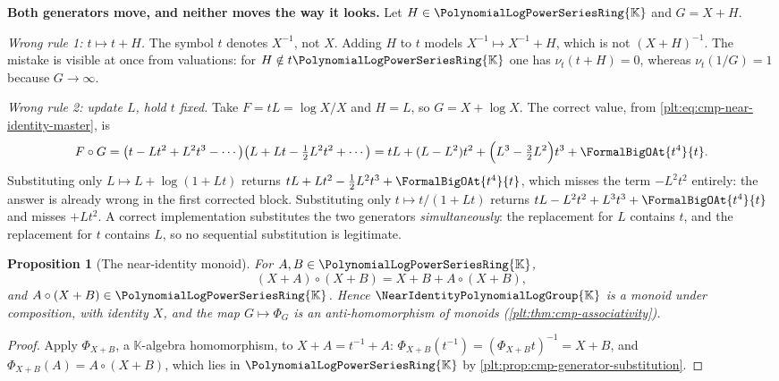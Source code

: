 \documentclass[11pt,oneside]{article}
\theoremstyle{plain}
\newtheorem{proposition}[theorem]{Proposition}
\theoremstyle{definition}
\theoremstyle{remark}
\newcommand{\K}{\mathbb{K}}
\newcommand{\PLpow}{\PolynomialLogPowerSeriesRing{\K}}   %
\newcommand{\Gnear}{\NearIdentityPolynomialLogGroup{\K}} %
\newcommand{\ordt}{\nu_{t}}                              %
\newcommand{\compose}{\mathbin{\circ}}
\begin{document}
\begin{warningbox}
\textbf{Both generators move, and neither moves the way it looks.}
Let \(H\in\PLpow\) and \(G=X+H\).

\emph{Wrong rule 1: \(t\mapsto t+H\).}  The symbol \(t\) denotes \(X^{-1}\),
not \(X\).  Adding \(H\) to \(t\) models \(X^{-1}\mapsto X^{-1}+H\), which is
not \((X+H)^{-1}\).  The mistake is visible at once from valuations: for
\(H\notin t\PLpow\) one has \(\ordt(t+H)=0\), whereas \(\ordt(1/G)=1\) because
\(G\to\infty\).

\emph{Wrong rule 2: update \(L\), hold \(t\) fixed.}  Take
\(F=tL=\log X/X\) and \(H=L\), so \(G=X+\log X\).  The correct value, from
\eqref{plt:eq:cmp-near-identity-master}, is
\[
 F\compose G
 =\bigl(t-Lt^{2}+L^{2}t^{3}-\cdots\bigr)
  \bigl(L+Lt-\tfrac12L^{2}t^{2}+\cdots\bigr)
 =tL+(L-L^{2})t^{2}+\Bigl(L^{3}-\tfrac32L^{2}\Bigr)t^{3}
  +\FormalBigOAt{t^{4}}{t}.
\]
Substituting only \(L\mapsto L+\log(1+Lt)\) returns
\(tL+Lt^{2}-\tfrac12L^{2}t^{3}+\FormalBigOAt{t^{4}}{t}\), which misses the
term \(-L^{2}t^{2}\) entirely: the answer is already wrong in the first
corrected block.  Substituting only \(t\mapsto t/(1+Lt)\) returns
\(tL-L^{2}t^{2}+L^{3}t^{3}+\FormalBigOAt{t^{4}}{t}\) and misses \(+Lt^{2}\).
A correct implementation substitutes
the two generators \emph{simultaneously}: the replacement for \(L\) contains
\(t\), and the replacement for \(t\) contains \(L\), so no sequential
substitution is legitimate.
\end{warningbox}

\begin{proposition}[The near-identity monoid]\label{plt:prop:cmp-near-monoid}
For \(A,B\in\PLpow\),
\begin{equation}\label{plt:eq:cmp-near-group-law}
 (X+A)\compose(X+B)=X+B+A\compose(X+B),
\end{equation}
and \(A\compose(X+B)\in\PLpow\).  Hence \(\Gnear\) is a monoid under
composition, with identity \(X\), and the map
\(G\mapsto\Phi_G\) is an anti-homomorphism of monoids
(\cref{plt:thm:cmp-associativity}).
\end{proposition}

\begin{proof}
Apply \(\Phi_{X+B}\), a \(\K\)-algebra homomorphism, to \(X+A=t^{-1}+A\):
\(\Phi_{X+B}(t^{-1})=(\Phi_{X+B}t)^{-1}=X+B\), and
\(\Phi_{X+B}(A)=A\compose(X+B)\), which lies in \(\PLpow\) by
\cref{plt:prop:cmp-generator-substitution}.
\end{proof}
\end{document}
